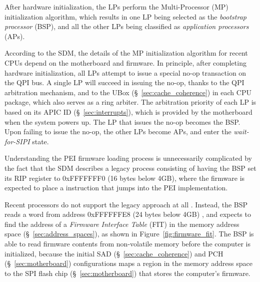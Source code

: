 
After hardware initialization, the LPs perform the Multi-Processor (MP)
initialization algorithm, which results in one LP being selected as the
\textit{bootstrap processor} (BSP), and all the other LPs being classified as
\textit{application processors} (APs).

According to the SDM, the details of the MP initialization algorithm for recent
CPUs depend on the motherboard and firmware. In principle, after completing
hardware initialization, all LPs attempt to issue a special no-op transaction
on the QPI bus. A single LP will succeed in issuing the no-op, thanks to
the QPI arbitration mechanism, and to the UBox (\S~\ref{sec:cache_coherence})
in each CPU package, which also serves as a ring arbiter. The arbitration
priority of each LP is based on its APIC ID (\S~\ref{sec:interrupts}), which is
provided by the motherboard when the system powers up. The LP that issues the
no-op becomes the BSP. Upon failing to issue the no-op, the other LPs become
APs, and enter the \textit{wait-for-SIPI} state.


Understanding the PEI firmware loading process is unnecessarily complicated by
the fact that the SDM describes a legacy process consisting of having the BSP
set its RIP register to 0xFFFFFFF0 (16 bytes below 4GB), where the firmware is
expected to place a instruction that jumps into the PEI implementation.


Recent processors do not support the legacy approach at all
\cite{reinauer2013fitpatch}. Instead, the BSP reads a word from address
0xFFFFFFE8 (24 bytes below 4GB) \cite{intel2012uefihypervisor, datta2013acm},
and expects to find the address of a \textit{Firmware Interface Table} (FIT)
in the memory address space (\S~\ref{sec:address_spaces}), as shown in
Figure~\ref{fig:firmware_fit}. The BSP is able to read firmware contents from
non-volatile memory before the computer is initialized, because the initial SAD
(\S~\ref{sec:cache_coherence}) and PCH (\S~\ref{sec:motherboard})
configurations maps a region in the memory address space to the SPI flash chip
(\S~\ref{sec:motherboard}) that stores the computer's firmware.

